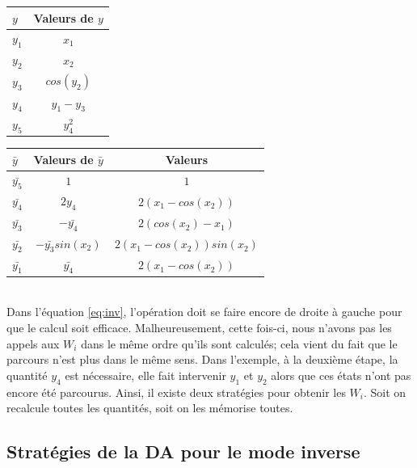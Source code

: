 \vspace{1cm}
\begin{tabular}{|l|c|}
  \hline
  $y$ & Valeurs de $y$ \\
  \hline
  $y_1$ & $x_1$ \\
  $y_2$ & $x_2$ \\
  $y_3$ & $cos(y_2)$ \\
  $y_4$ & $y_1-y_3$ \\
  $y_5$ & $y_4^2$ \\
  \hline
\end{tabular}
\hspace{1cm}
\begin{tabular}{|l|c|c|}
  \hline
 $\bar{y}$ & Valeurs de $\bar{y}$ & Valeurs \\
  \hline
 $\bar{y_5}$ & $1$ & $1$ \\
 $\bar{y_4}$ & $2y_4$ & $2(x_1-cos(x_2))$ \\
 $\bar{y_3}$ & $-\bar{y_4}$ & $2(cos(x_2)-x_1)$ \\
 $\bar{y_2}$ & $-\bar{y_3}sin(x_2)$ & $2(x_1-cos(x_2))sin(x_2)$ \\
 $\bar{y_1}$ & $\bar{y_4}$ & $2(x_1-cos(x_2))$ \\
  \hline
\end{tabular}\\

\noindent
Dans l'\'equation \ref{eq:inv}, l'op\'eration doit se faire encore de droite \`a gauche pour que le calcul soit efficace. Malheureusement, cette fois-ci,
nous n'avons pas les appels aux $W_i$ dans le même ordre qu'ils sont calcul\'es; cela vient du fait que le parcours
n'est plus dans le même sens. Dans l'exemple, \`a la deuxi\`eme \'etape, la 
quantit\'e $y_4$ est n\'ecessaire, elle fait intervenir $y_1$ et $y_2$ alors que ces \'etats n'ont pas encore \'et\'e parcourus.
Ainsi, il existe deux strat\'egies pour obtenir les $W_i$. Soit on recalcule toutes les quantit\'es, soit on les m\'emorise toutes.




    \subsection{Strat\'egies de la DA pour le mode inverse}
% 
% 
\label{subsection:strategies}
